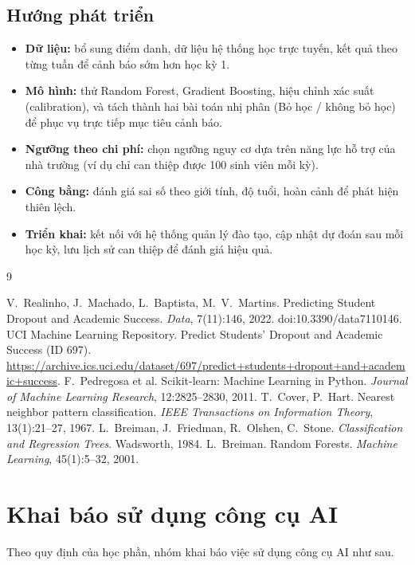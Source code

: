 \documentclass[12pt,a4paper,oneside]{report}
\begin{document}
\section{Hướng phát triển}
\begin{itemize}
  \item \textbf{Dữ liệu:} bổ sung điểm danh, dữ liệu hệ thống học trực tuyến, kết quả theo từng tuần để cảnh báo sớm hơn học kỳ 1.
  \item \textbf{Mô hình:} thử Random Forest, Gradient Boosting, hiệu chỉnh xác suất (calibration), và tách thành hai bài toán nhị phân (Bỏ học / không bỏ học) để phục vụ trực tiếp mục tiêu cảnh báo.
  \item \textbf{Ngưỡng theo chi phí:} chọn ngưỡng nguy cơ dựa trên năng lực hỗ trợ của nhà trường (ví dụ chỉ can thiệp được 100 sinh viên mỗi kỳ).
  \item \textbf{Công bằng:} đánh giá sai số theo giới tính, độ tuổi, hoàn cảnh để phát hiện thiên lệch.
  \item \textbf{Triển khai:} kết nối với hệ thống quản lý đào tạo, cập nhật dự đoán sau mỗi học kỳ, lưu lịch sử can thiệp để đánh giá hiệu quả.
\end{itemize}

\begin{thebibliography}{9}
 V.~Realinho, J.~Machado, L.~Baptista, M.~V.~Martins.
  Predicting Student Dropout and Academic Success. \emph{Data}, 7(11):146, 2022. doi:10.3390/data7110146.
 UCI Machine Learning Repository. Predict Students' Dropout and Academic Success (ID 697).
  \url{https://archive.ics.uci.edu/dataset/697/predict+students+dropout+and+academic+success}.
 F.~Pedregosa et al. Scikit-learn: Machine Learning in Python.
  \emph{Journal of Machine Learning Research}, 12:2825--2830, 2011.
 T.~Cover, P.~Hart. Nearest neighbor pattern classification.
  \emph{IEEE Transactions on Information Theory}, 13(1):21--27, 1967.
 L.~Breiman, J.~Friedman, R.~Olshen, C.~Stone. \emph{Classification and Regression Trees}. Wadsworth, 1984.
 L.~Breiman. Random Forests. \emph{Machine Learning}, 45(1):5--32, 2001.
\end{thebibliography}

\appendix
\chapter{Khai báo sử dụng công cụ AI}
Theo quy định của học phần, nhóm khai báo việc sử dụng công cụ AI như sau.
\end{document}
